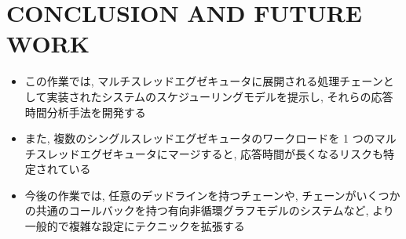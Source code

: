 
\section{CONCLUSION AND FUTURE WORK}
\label{sec: conclusion and future work}

\begin{frame}{}
    \begin{itemize}
        \item この作業では, マルチスレッドエグゼキュータに展開される処理チェーンとして実装されたシステムのスケジューリングモデルを提示し, それらの応答時間分析手法を開発する
\item また, 複数のシングルスレッドエグゼキュータのワークロードを 1 つのマルチスレッドエグゼキュータにマージすると, 応答時間が長くなるリスクも特定されている
\item 今後の作業では, 任意のデッドラインを持つチェーンや, チェーンがいくつかの共通のコールバックを持つ有向非循環グラフモデルのシステムなど, より一般的で複雑な設定にテクニックを拡張する
    \end{itemize}
\end{frame}
